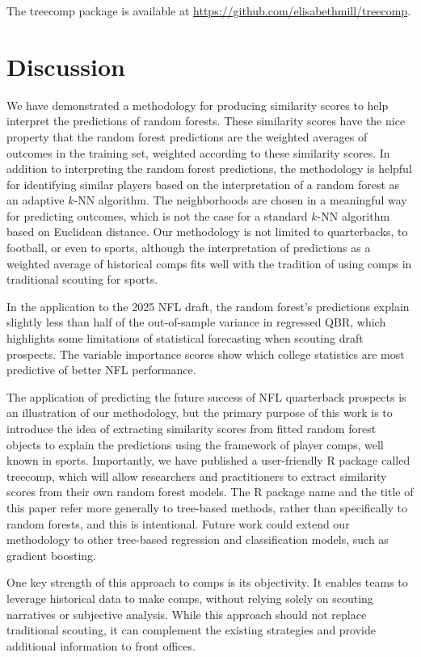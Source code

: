 \documentclass{article}
\begin{document}
The treecomp package is available at \url{https://github.com/elisabethmill/treecomp}.

\section{Discussion}
\label{sec:discussion}

We have demonstrated a methodology for producing similarity scores to help interpret the predictions of random forests. These similarity scores have the nice property that the random forest predictions are the weighted averages of outcomes in the training set, weighted according to these similarity scores. In addition to interpreting the random forest predictions, the methodology is helpful for identifying similar players based on the interpretation of a random forest as an adaptive $k$-NN algorithm. The neighborhoods are chosen in a meaningful way for predicting outcomes, which is not the case for a standard $k$-NN algorithm based on Euclidean distance. Our methodology is not limited to quarterbacks, to football, or even to sports, although the interpretation of predictions as a weighted average of historical comps fits well with the tradition of using comps in traditional scouting for sports.

In the application to the 2025 NFL draft, the random forest's predictions explain slightly less than half of the out-of-sample variance in regressed QBR, which highlights some limitations of statistical forecasting when scouting draft prospects. The variable importance scores show which college statistics are most predictive of better NFL performance.

The application of predicting the future success of NFL quarterback prospects is an illustration of our methodology, but the primary purpose of this work is to introduce the idea of extracting similarity scores from fitted random forest objects to explain the predictions using the framework of player comps, well known in sports. Importantly, we have published a user-friendly R package called treecomp, which will allow researchers and practitioners to extract similarity scores from their own random forest models. The R package name and the title of this paper refer more generally to tree-based methods, rather than specifically to random forests, and this is intentional. Future work could extend our methodology to other tree-based regression and classification models, such as gradient boosting.

One key strength of this approach to comps is its objectivity. It enables teams to leverage historical data to make comps, without relying solely on scouting narratives or subjective analysis. While this approach should not replace traditional scouting, it can complement the existing strategies and provide additional information to front offices. 
\end{document}

